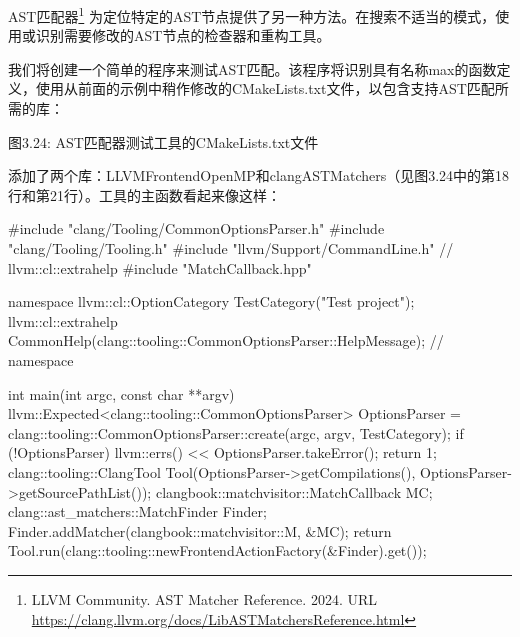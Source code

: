 AST匹配器\footnote{LLVM Community. AST Matcher Reference. 2024. URL \url{https://clang.llvm.org/docs/LibASTMatchersReference.html}} 为定位特定的AST节点提供了另一种方法。在搜索不适当的模式，使用或识别需要修改的AST节点的检查器和重构工具。

我们将创建一个简单的程序来测试AST匹配。该程序将识别具有名称max的函数定义，使用从前面的示例中稍作修改的CMakeLists.txt文件，以包含支持AST匹配所需的库：


\begin{center}
图3.24: AST匹配器测试工具的CMakeLists.txt文件
\end{center}

添加了两个库：LLVMFrontendOpenMP和clangASTMatchers（见图3.24中的第18行和第21行）。工具的主函数看起来像这样：

\begin{cpp}
#include "clang/Tooling/CommonOptionsParser.h"
#include "clang/Tooling/Tooling.h"
#include "llvm/Support/CommandLine.h" // llvm::cl::extrahelp
#include "MatchCallback.hpp"

namespace {
llvm::cl::OptionCategory TestCategory("Test project");
llvm::cl::extrahelp
  CommonHelp(clang::tooling::CommonOptionsParser::HelpMessage);
} // namespace

int main(int argc, const char **argv) {
  llvm::Expected<clang::tooling::CommonOptionsParser> OptionsParser =
    clang::tooling::CommonOptionsParser::create(argc, argv, TestCategory);
  if (!OptionsParser) {
    llvm::errs() << OptionsParser.takeError();
    return 1;
  }
  clang::tooling::ClangTool Tool(OptionsParser->getCompilations(),
                                 OptionsParser->getSourcePathList());
  clangbook::matchvisitor::MatchCallback MC;
  clang::ast_matchers::MatchFinder Finder;
  Finder.addMatcher(clangbook::matchvisitor::M, &MC);
  return Tool.run(clang::tooling::newFrontendActionFactory(&Finder).get());
}
\end{cpp}

